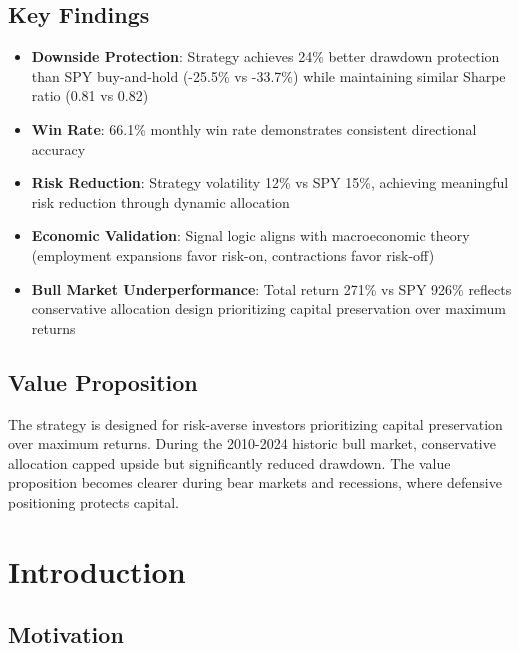 \documentclass[12pt,a4paper]{article}
\begin{document}
\subsection{Key Findings}

\begin{itemize}[leftmargin=*]
    \item \textbf{Downside Protection}: Strategy achieves 24\% better drawdown protection than SPY buy-and-hold (-25.5\% vs -33.7\%) while maintaining similar Sharpe ratio (0.81 vs 0.82)

    \item \textbf{Win Rate}: 66.1\% monthly win rate demonstrates consistent directional accuracy

    \item \textbf{Risk Reduction}: Strategy volatility 12\% vs SPY 15\%, achieving meaningful risk reduction through dynamic allocation

    \item \textbf{Economic Validation}: Signal logic aligns with macroeconomic theory (employment expansions favor risk-on, contractions favor risk-off)

    \item \textbf{Bull Market Underperformance}: Total return 271\% vs SPY 926\% reflects conservative allocation design prioritizing capital preservation over maximum returns
\end{itemize}

\subsection{Value Proposition}

The strategy is designed for risk-averse investors prioritizing capital preservation over maximum returns. During the 2010-2024 historic bull market, conservative allocation capped upside but significantly reduced drawdown. The value proposition becomes clearer during bear markets and recessions, where defensive positioning protects capital.

\newpage
\section{Introduction}

\subsection{Motivation}
\end{document}
